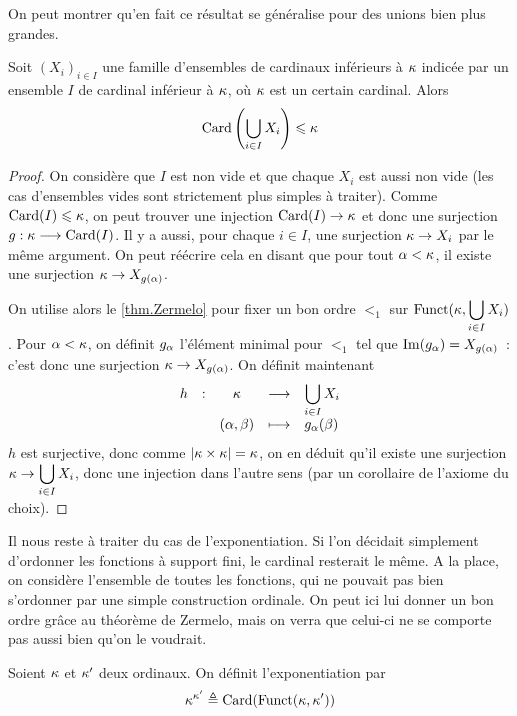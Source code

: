 \noindent
On peut montrer qu'en fait ce résultat se généralise pour des unions bien plus
grandes.

\begin{proposition}\label{prop.card.union}
  Soit $(X_i)_{i\in I}$ une famille d'ensembles de cardinaux inférieurs à
  $\kappa$ indicée par un ensemble $I$ de cardinal inférieur à $\kappa$, où
  $\kappa$ est un certain cardinal. Alors
  \[\operatorname{Card}\left(\bigcup_{i\in I} X_i\right)\leqslant \kappa\]
\end{proposition}

\begin{proof}
  On considère que $I$ est non vide et que chaque $X_i$ est aussi non vide
  (les cas d'ensembles vides sont strictement plus simples à traiter). Comme
  $\operatorname{Card}(I) \leqslant \kappa$, on peut trouver une injection $\operatorname{Card}(I) \to \kappa$
  et donc une surjection $g : \displaystyle \kappa \longrightarrow \operatorname{Card}(I)$. Il y a aussi, pour
  chaque $i \in I$, une surjection $\kappa \to X_i$ par le même argument. On
  peut réécrire cela en disant que pour tout $\alpha < \kappa$, il existe une
  surjection $\kappa \to X_{g(\alpha)}$.

  On utilise alors le \cref{thm.Zermelo} pour fixer un bon ordre $<_1$ sur
  $\displaystyle\operatorname{Funct}(\kappa,\bigcup_{i \in I} X_i)$. Pour $\alpha < \kappa$,
  on définit $g_\alpha$ l'élément minimal pour $<_1$ tel que
  $\operatorname{Im}(g_\alpha) = X_{g(\alpha)}$~: c'est donc une surjection
  $\kappa\to X_{g(\alpha)}$. On définit maintenant
  \[
  \makeFun{h}{\varCk}{\bigcup_{i \in I} X_i}{(\varOa,\varOb)}{g_{\varOa}(\varOb)}
  \]
  $h$ est surjective, donc comme $|\kappa \times \kappa| = \kappa$, on en
  déduit qu'il existe une surjection
  $\displaystyle\kappa \to \bigcup_{i \in I} X_i$, donc une injection dans l'autre
  sens (par un corollaire de l'axiome du choix).
\end{proof}

Il nous reste à traiter du cas de l'exponentiation. Si l'on décidait simplement
d'ordonner les fonctions à support fini, le cardinal resterait le même. A la
place, on considère l'ensemble de toutes les fonctions, qui ne pouvait pas
bien s'ordonner par une simple construction ordinale. On peut ici lui donner
un bon ordre grâce au théorème de Zermelo, mais on verra que celui-ci ne se
comporte pas aussi bien qu'on le voudrait.

\begin{definition}
  Soient $\kappa$ et $\kappa'$ deux ordinaux. On définit l'exponentiation
  par
  \[\kappa^{\kappa'} \triangleq \operatorname{Card}(\operatorname{Funct}(\kappa,\kappa'))\]
\end{definition}

